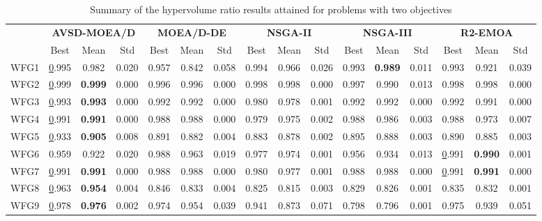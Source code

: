 \begin{table*}[t]
\caption{Summary of the hypervolume ratio results attained for problems with two objectives}
\label{tab:StatisticsHV_2obj}
\centering
\begin{tabular}{c c|c|c|c|c|c|c|c|c|c|c|c|c|c|c}
\cline{2-16}
 & \multicolumn{3}{c|}{\textbf{AVSD-MOEA/D}} & \multicolumn{3}{c|}{\textbf{MOEA/D-DE}} & \multicolumn{3}{c|}{\textbf{NSGA-II}} & \multicolumn{3}{c|}{\textbf{NSGA-III}} & \multicolumn{3}{c}{\textbf{R2-EMOA}} \\ \cline{2-16} 
 & Best & Mean & Std & Best & Mean & Std & Best & Mean & Std & Best & Mean & Std & Best & Mean & Std \\ \hline
\multicolumn{1}{c|}{WFG1} & {\ul 0.995} & 0.982 & 0.020 & 0.957 & 0.842 & 0.058 & 0.994 & 0.966 & 0.026 & 0.993 & \textbf{0.989} & 0.011 & 0.993 & 0.921 & 0.039 \\ \hline
\multicolumn{1}{c|}{WFG2} & {\ul 0.999} & \textbf{0.999} & 0.000 & 0.996 & 0.996 & 0.000 & 0.998 & 0.998 & 0.000 & 0.997 & 0.990 & 0.013 & 0.998 & 0.998 & 0.000 \\ \hline
\multicolumn{1}{c|}{WFG3} & {\ul 0.993} & \textbf{0.993} & 0.000 & 0.992 & 0.992 & 0.000 & 0.980 & 0.978 & 0.001 & 0.992 & 0.992 & 0.000 & 0.992 & 0.991 & 0.000 \\ \hline
\multicolumn{1}{c|}{WFG4} & {\ul 0.991} & \textbf{0.991} & 0.000 & 0.988 & 0.988 & 0.000 & 0.979 & 0.975 & 0.002 & 0.988 & 0.986 & 0.003 & 0.988 & 0.973 & 0.007 \\ \hline
\multicolumn{1}{c|}{WFG5} & {\ul 0.933} & \textbf{0.905} & 0.008 & 0.891 & 0.882 & 0.004 & 0.883 & 0.878 & 0.002 & 0.895 & 0.888 & 0.003 & 0.890 & 0.885 & 0.003 \\ \hline
\multicolumn{1}{c|}{WFG6} & 0.959 & 0.922 & 0.020 & 0.988 & 0.963 & 0.019 & 0.977 & 0.974 & 0.001 & 0.956 & 0.934 & 0.013 & {\ul 0.991} & \textbf{0.990} & 0.001 \\ \hline
\multicolumn{1}{c|}{WFG7} & {\ul 0.991} & \textbf{0.991} & 0.000 & 0.988 & 0.988 & 0.000 & 0.980 & 0.977 & 0.001 & 0.988 & 0.988 & 0.000 & {\ul 0.991} & \textbf{0.991} & 0.000 \\ \hline
\multicolumn{1}{c|}{WFG8} & {\ul 0.963} & \textbf{0.954} & 0.004 & 0.846 & 0.833 & 0.004 & 0.825 & 0.815 & 0.003 & 0.829 & 0.826 & 0.001 & 0.835 & 0.832 & 0.001 \\ \hline
\multicolumn{1}{c|}{WFG9} & {\ul 0.978} & \textbf{0.976} & 0.002 & 0.974 & 0.954 & 0.039 & 0.941 & 0.873 & 0.071 & 0.798 & 0.796 & 0.001 & 0.975 & 0.939 & 0.051 \\ \hline

\end{tabular}
\end{table*}
